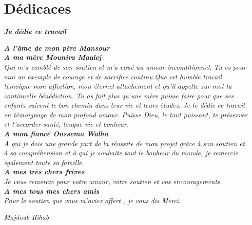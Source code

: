 \section*{Dédicaces}
\vspace{1.0in}

\begin{center}
\textit{\textsl{ \textbf{Je dédie ce travail} } }
\end{center}
\begin{center}
\textsl{
 \textbf{A l'âme de mon père Mansour}
 \\[0.2in]
 \textbf{A ma mère Mounira Maalej}\\ 
 Qui m'a comblé de son soutien et m'a 
voué un amour inconditionnel. Tu es pour moi un exemple de
courage et de sacrifice continu.Que cet humble travail témoigne
mon affection, mon éternel attachement et qu'il appelle sur moi
ta continuelle bénédiction. Tu as fait plus qu’une mère puisse faire pour que ses 
enfants suivent le bon chemin dans leur vie et leurs études. 
Je te dédie ce travail en témoignage de mon profond 
amour. Puisse Dieu, le tout puissant, te préserver et 
t’accorder santé, longue vie et bonheur.
\\[0.2in]
\textbf{A mon fiancé Oussema Walha}\\
A qui je dois une grande part de la réussite de mon projet grâce à
son soutien et à sa compréhension et à qui je souhaite tout le bonheur du monde,
je remercie également toute sa famille.
\\[0.2in]
\textbf{A mes très chers frères}\\
Je vous remercie pour votre amour, 
votre soutien et vos encouragements. 
\\[0.2in]
\textbf{A mes tous mes chers amis}\\
Pour le soutien que vous m'aviez
offert , je vous dis Merci.}
\begin{flushright}
 \textit{\emph {Majdoub Rihab}}
\end{flushright}

\end{center}



